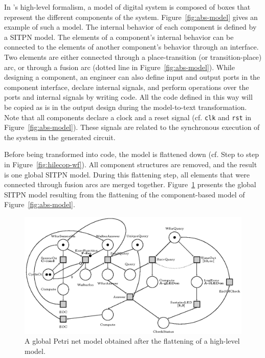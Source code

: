 \documentclass[pdflatex,sn-mathphys]{sn-jnl}%
\theoremstyle{thmstyleone}%
\theoremstyle{thmstyletwo}%
\theoremstyle{thmstylethree}%
\begin{document}
In \hilecop{}'s high-level formalism, a model of digital system is
composed of boxes that represent the different components of the
system. Figure~\ref{fig:abs-model} gives an example of such a model.
The internal behavior of each component is defined by a SITPN model.
The elements of a component's internal behavior can be connected to
the elements of another component's behavior through an interface. Two
elements are either connected through a place-transition (or
transition-place) arc, or through a fusion arc (dotted line in
Figure~\ref{fig:abs-model}). While designing a component, an engineer
can also define input and output ports in the component interface,
declare internal signals, and perform operations over the ports and
internal signals by writing \vhdl{} code. All the \vhdl{} code defined
in this way will be copied as is in the output \vhdl{} design during
the model-to-text transformation. Note that all components declare a
clock and a reset signal (cf. \texttt{clk} and \texttt{rst} in
Figure~\ref{fig:abs-model}). These signals are related to the
synchronous execution of the system in the generated circuit.

Before being transformed into \vhdl{} code, the model is flattened
down (cf. Step  to step  in
Figure~\ref{fig:hilecop-wf}). All component structures are removed,
and the result is one global SITPN model. During this flattening step,
all elements that were connected through fusion arcs are merged
together. Figure~\ref{fig:impl-model} presents the global SITPN model
resulting from the flattening of the component-based model of
Figure~\ref{fig:abs-model}.

\begin{figure}[H]
\centering
\includegraphics[keepaspectratio=true,width=\textwidth] {impl-model.eps}
\caption[Global Petri net model.]{A global Petri net model obtained
  after the flattening of a \hilecop{} high-level model.}
\label{fig:impl-model}
\end{figure}
\end{document}

